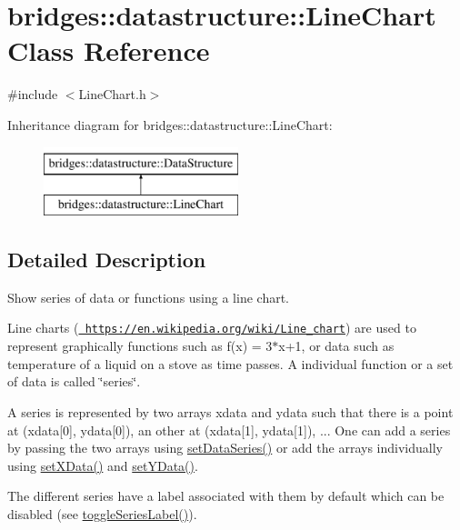 \hypertarget{classbridges_1_1datastructure_1_1_line_chart}{}\section{bridges\+::datastructure\+::Line\+Chart Class Reference}
\label{classbridges_1_1datastructure_1_1_line_chart}


{\ttfamily \#include $<$Line\+Chart.\+h$>$}

Inheritance diagram for bridges\+::datastructure\+::Line\+Chart\+:\begin{figure}[H]
\begin{center}
\leavevmode
\includegraphics[height=2.000000cm]{classbridges_1_1datastructure_1_1_line_chart}
\end{center}
\end{figure}


\subsection{Detailed Description}
Show series of data or functions using a line chart. 

Line charts (\href{https://en.wikipedia.org/wiki/Line_chart}{\texttt{ https\+://en.\+wikipedia.\+org/wiki/\+Line\+\_\+chart}}) are used to represent graphically functions such as f(x) = 3$\ast$x+1, or data such as temperature of a liquid on a stove as time passes. A individual function or a set of data is called \char`\"{}series\char`\"{}.

A series is represented by two arrays xdata and ydata such that there is a point at (xdata\mbox{[}0\mbox{]}, ydata\mbox{[}0\mbox{]}), an other at (xdata\mbox{[}1\mbox{]}, ydata\mbox{[}1\mbox{]}), ... One can add a series by passing the two arrays using \mbox{\hyperlink{classbridges_1_1datastructure_1_1_line_chart_acb763ea4b2d0f27c73edc3861cc51fbb}{set\+Data\+Series()}} or add the arrays individually using \mbox{\hyperlink{classbridges_1_1datastructure_1_1_line_chart_aa9959489d71e31645f561c4481f050d2}{set\+X\+Data()}} and \mbox{\hyperlink{classbridges_1_1datastructure_1_1_line_chart_a861370f3f7b32cc1a9347727d084d307}{set\+Y\+Data()}}.

The different series have a label associated with them by default which can be disabled (see \mbox{\hyperlink{classbridges_1_1datastructure_1_1_line_chart_a21031cd026426ab91307626ce9651c03}{toggle\+Series\+Label()}}).

